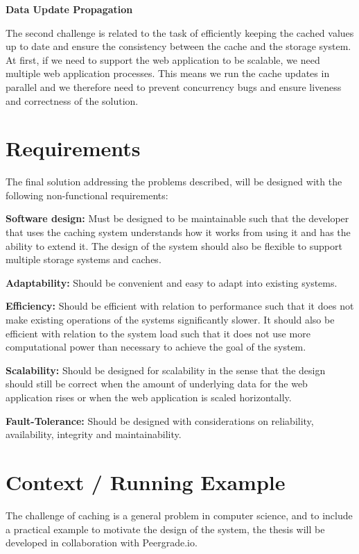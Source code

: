 \textbf{Data Update Propagation}

The second challenge is related to the task of efficiently keeping the cached values up to date and ensure the consistency between the cache and the storage system. At first, if we need to support the web application to be scalable, we need multiple web application processes. This means we run the cache updates in parallel and we therefore need to prevent concurrency bugs and ensure liveness and correctness of the solution.

\section{Requirements}
\label{sec:requirements}

The final solution addressing the problems described, will be designed with the following non-functional requirements:

\textbf{Software design:} Must be designed to be maintainable such that the developer that uses the caching system understands how it works from using it and has the ability to extend it. The design of the system should also be flexible to support multiple storage systems and caches.

\textbf{Adaptability:} Should be convenient and easy to adapt into existing systems.

\textbf{Efficiency:} Should be efficient with relation to performance such that it does not make existing operations of the systems significantly slower. It should also be efficient with relation to the system load such that it does not use more computational power than necessary to achieve the goal of the system.

\textbf{Scalability:} Should be designed for scalability in the sense that the design should still be correct when the amount of underlying data for the web application rises or when the web application is scaled horizontally.

\textbf{Fault-Tolerance:} Should be designed with considerations on reliability, availability, integrity and maintainability.


\section{Context / Running Example}
\label{sec:context}

The challenge of caching is a general problem in computer science, and to include a practical example to motivate the design of the system, the thesis will be developed in collaboration with Peergrade.io.


